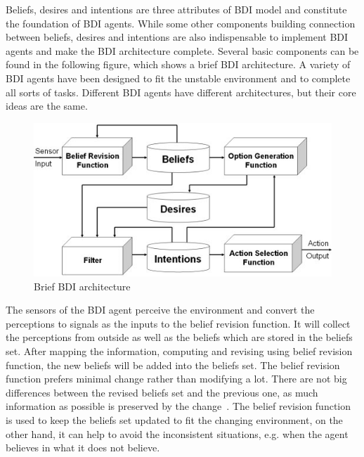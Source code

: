 Beliefs, desires and intentions are three attributes of BDI model and constitute the foundation of BDI agents. While some other components building connection between beliefs, desires and intentions are also indispensable to implement BDI agents and make the BDI architecture complete.
Several basic components can be found in the following figure, which shows a brief BDI architecture. A variety of BDI agents have been designed to fit the unstable environment and to complete all sorts of tasks. Different BDI agents have different architectures, but their core ideas are the same.

\begin{figure}[htbp]
  \centering
  \includegraphics[width=\textwidth]{images/BDIAr}
  \caption{Brief BDI architecture~\cite{BDIA}}%
  \label{fig:Brief BDI architecture}
\end{figure}

The sensors of the BDI agent perceive the environment and convert the perceptions to signals as the inputs to the belief revision function. It will collect the perceptions from outside as well as the beliefs which are stored in the beliefs set. After mapping the information, computing and revising using belief revision function, the new beliefs will be added into the beliefs set. The belief revision function prefers minimal change rather than modifying a lot. There are not big differences between the revised beliefs set and the previous one, as much information as possible is preserved by the change~\cite{Antje_SpatialBelief_2011}. The belief revision function is used to keep the beliefs set updated to fit the changing environment, on the other hand, it can help to avoid the inconsistent situations, e.g. when the agent believes in what it does not believe.


